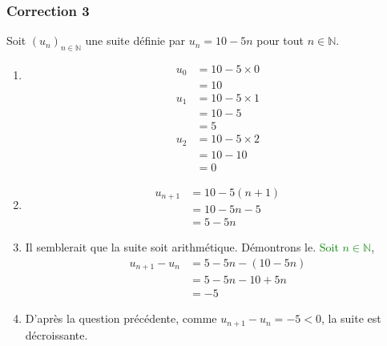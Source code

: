 \documentclass[15pt, mathserif]{beamer}
\newcommand{\N}{\mathbb{N}}			%
\newcommand{\st}[1]{$(#1_n)_{n \in \N}$}
\begin{document}
\begin{frame}
\vspace{-10mm}
	\frametitle{Correction 3}
\vspace*{0.5cm} 
 
 Soit \st{u} une suite définie par $u_n=10-5n$ pour tout $n \in \N$. 
 
 \begin{enumerate} 
 	 \item \begin{multicols}{3} 
 
 \begin{align*} 
 u_0 &=10-5\times 0 \\ &= 10\end{align*}  
 \columnbreak 
 \begin{align*} 
 u_1 &= 10-5\times 1 \\ 
 &= 10-5\\ 
 &= 5 
 \end{align*}  
 \columnbreak 
 \begin{align*} 
 u_2 &= 10-5\times 2 \\ 
 &= 10-10\\ 
 &= 0 
 \end{align*} 
 \end{multicols} 
 \vfil 
 	 \item \begin{align*} u_{n+1} &= 10-5(n+1) \\ &=  10-5n -5 \\ &=  5-5n 
 \end{align*} \end{enumerate} 
 
 \end{frame} 
 
 \begin{frame}  
 \begin{enumerate} \setcounter{enumi}{2}  
 	 \item Il semblerait que la suite soit arithmétique. Démontrons le.  \textcolor{green}{Soit $n \in \N$}, \begin{align*} 
 u_{n+1}-u_n &=  5-5n -\left(10-5n \right) \\ 
 &= 5-5n -10+5n \\ 
 &= -5 
 \end{align*} 
 \vfil 
 	 \item  D'après la question précédente, comme $u_{n+1}-u_n= -5<0$, la suite est décroissante.
 
 \end{enumerate} \end{frame}
\end{document}
